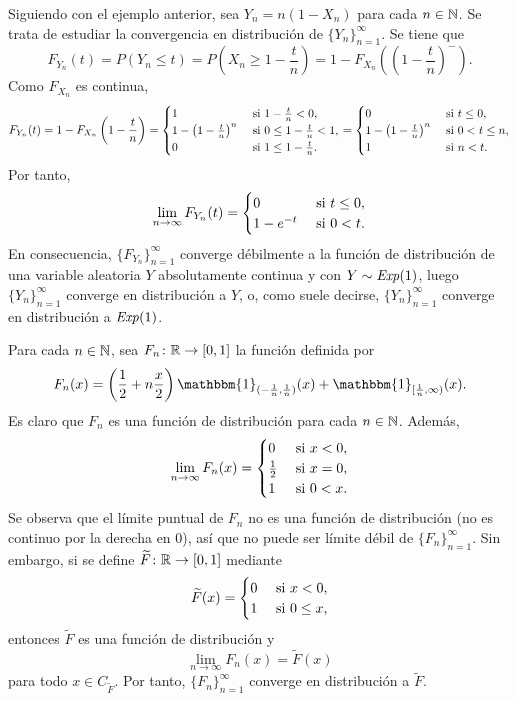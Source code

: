 \documentclass[a4paper, 11pt, extrafontsizes]{memoir}
\begin{document}
\begin{example}
    Siguiendo con el ejemplo anterior, sea $Y_n = n(1-X_n)$ para cada $n \in \mathbb N$. Se trata de estudiar la convergencia en distribución de $\{Y_n\}_{n=1}^\infty$. Se tiene que
    \[F_{Y_n}(t) = P(Y_n \leq t) = P\left(X_n \geq 1-\frac{t}{n}\right) = 1 - F_{X_n}\left(\left(1-\frac{t}{n}\right)^-\right).\]
    Como $F_{X_n}$ es continua,
    \[F_{Y_n}(t) = 1 - F_{X_n}\left(1-\frac{t}{n}\right) = \begin{cases}
        1 & $ si $ 1 - \frac{t}{n} < 0, \\
        1 - \left(1-\frac{t}{n}\right)^n & $ si $ 0 \leq 1- \frac{t}{n} < 1, \\
        0 & $ si $ 1 \leq 1 - \frac{t}{n}.
    \end{cases} =  \begin{cases}
        0 & $ si $ t \leq 0, \\
        1 - \left(1-\frac{t}{n}\right)^n & $ si $ 0 < t \leq n, \\
        1 & $ si $ n < t.
    \end{cases}\]
    Por tanto,
    \[\lim_{n \to \infty} F_{Y_n}(t) = \begin{cases}
        0 & $ si $ t \leq 0, \\
        1-e^{-t} & $ si $ 0 < t.
    \end{cases}\]
    En consecuencia, $\{F_{Y_n}\}_{n=1}^\infty$ converge débilmente a la función de distribución de una variable aleatoria $Y$ absolutamente continua y con $Y \sim \textup{\emph{Exp}}(1)$, luego $\{Y_n\}_{n=1}^\infty$ converge en distribución a $Y$, o, como suele decirse, $\{Y_n\}_{n=1}^\infty$ converge en distribución a $\textup{\emph{Exp}}(1)$.
\end{example}

\begin{example}
    Para cada $n \in \mathbb N$, sea $F_n \colon \mathbb R \to [0,1]$ la función definida por
    \[F_n(x) = \left(\frac{1}{2}+n\frac{x}{2}\right)\mathbbm{1}_{(-\frac{1}{n},\frac{1}{n})}(x)+\mathbbm{1}_{[\frac{1}{n},\infty)}(x).\]
    Es claro que $F_n$ es una función de distribución para cada $n \in \mathbb N$. Además,
    \[\lim_{n \to \infty} F_n(x) = \begin{cases}
        0 & $ si $ x < 0, \\
        \frac{1}{2} & $ si $ x = 0, \\
        1 & $ si $ 0 < x.
    \end{cases}\]
    Se observa que el límite puntual de $F_n$ no es una función de distribución (no es continuo por la derecha en $0$), así que no puede ser límite débil de $\{F_n\}_{n=1}^\infty$. Sin embargo, si se define $\widetilde{F} \colon \mathbb R \to [0,1]$ mediante
    \[\widetilde{F}(x) = \begin{cases}
        0 & $ si $ x < 0, \\
        1 & $ si $ 0 \leq x,
    \end{cases}\]
    entonces $\widetilde{F}$ es una función de distribución y
    \[\lim_{n \to \infty} F_n(x) = \widetilde{F}(x)\]
    para todo $x \in C_{\widetilde{F}}$. Por tanto, $\{F_n\}_{n=1}^\infty$ converge en distribución a $\widetilde{F}$.
\end{example}
\end{document}
